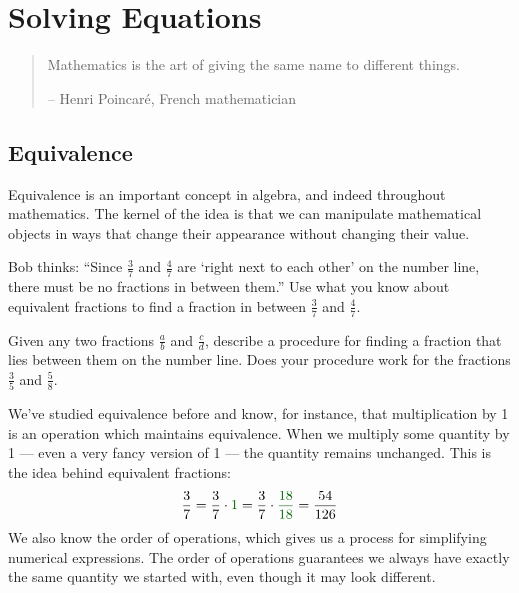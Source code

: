 \chapter{Solving Equations}
\label{ch:equations}

\begin{quote}
Mathematics is the art of giving the same name to different things.
\par\hfill -- Henri Poincar\'e, French mathematician
\end{quote}

\section{Equivalence}
\label{sec:equivalence}

Equivalence is an important concept in algebra, and indeed throughout mathematics. The kernel of the idea is that we can manipulate mathematical objects in ways that change their appearance without changing their value.

\begin{boxedexplore}
Bob thinks: ``Since $\frac{3}{7}$ and $\frac{4}{7}$ are `right next to each other' on the number line, there must be no fractions in between them.'' Use what you know about equivalent fractions to find a fraction in between $\frac{3}{7}$ and $\frac{4}{7}$.

Given any two fractions $\frac{a}{b}$ and $\frac{c}{d}$, describe a procedure for finding a fraction that lies between them on the number line. Does your procedure work for the fractions $\frac{3}{5}$ and $\frac{5}{8}$.
\end{boxedexplore} %

\begin{boxedexplore}
\end{boxedexplore}

We've studied equivalence before and know, for instance, that multiplication by 1 is an operation which maintains equivalence. When we multiply some quantity by 1 --- even a very fancy version of 1 --- the quantity remains unchanged. This is the idea behind equivalent fractions: \[\frac{3}{7} = \frac{3}{7}\cdot{\color{green!40!black}1} = \frac{3}{7}\cdot{\color{green!40!black}\frac{18}{18}} = \frac{54}{126}\]
We also know the order of operations, which gives us a process for simplifying numerical expressions. The order of operations guarantees we always have exactly the same quantity we started with, even though it may look different.

